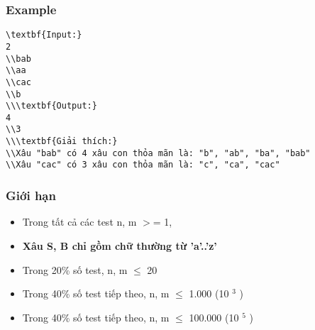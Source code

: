 \subsubsection{   Example  }
\begin{verbatim}
\textbf{Input:}
2
\\bab
\\aa
\\cac
\\b
\\\textbf{Output:}
4
\\3
\\\textbf{Giải thích:}
\\Xâu "bab" có 4 xâu con thỏa mãn là: "b", "ab", "ba", "bab"
\\Xâu "cac" có 3 xâu con thỏa mãn là: "c", "ca", "cac" \end{verbatim}

\subsubsection{   Giới hạn  }
\begin{itemize}
	\item     Trong tất cả các test n, m $>$= 1,   
	\item \textbf{     Xâu S, B chỉ gồm chữ thường từ 'a'..'z'    }
	\item     Trong 20\% số test, n, m  $\le$  20   
	\item     Trong 40\% số test tiếp theo, n, m  $\le$  1.000 (10    $^     3    $    )   
	\item     Trong 40\% số test tiếp theo, n, m  $\le$  100.000 (10    $^     5    $    )   
\end{itemize}
